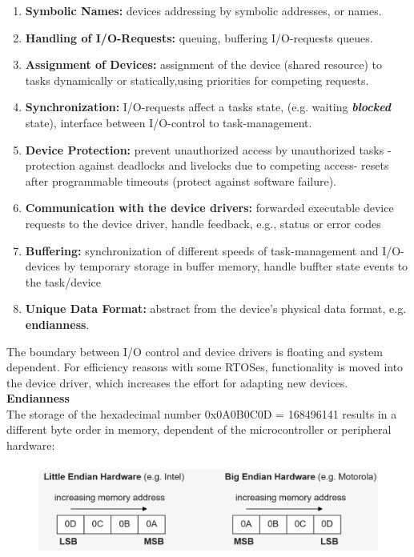 \begin{enumerate}
	\item  \textbf{Symbolic Names: }devices addressing by symbolic addresses, or names.
	\item  \textbf{Handling of I/O-Requests: }queuing, buffering I/O-requests  queues.
	\item  \textbf{Assignment of Devices: }assignment of the device (shared resource) to tasks dynamically or 	statically,using priorities for competing requests. 

	\item  \textbf{Synchronization: }I/O-requests affect a tasks state, (e.g. waiting  \textbf{\textit{blocked}} state), interface between I/O-control to task-management.

	\item  \textbf{Device Protection: } prevent unauthorized access by unauthorized tasks - protection against deadlocks and livelocks due to competing access- resets after programmable timeouts (protect against software failure).

	\item  \textbf{Communication with the device drivers: }forwarded executable device requests to the device driver, handle feedback, e.g., status or error codes 

	\item  \textbf{Buffering: }synchronization of different speeds of task-management and I/O-devices by temporary storage in buffer memory, handle buffter state events to the task/device

	\item  \textbf{Unique Data Format: }abstract from the device's physical data format, e.g. \textbf{endianness}.
\end{enumerate}

The boundary between I/O control and device drivers is floating and system dependent. For efficiency reasons with some RTOSes, functionality is moved into the device driver, which increases the effort for adapting new devices.\\

{\rot\bf Endianness}\\

The storage of the hexadecimal number 0x0A0B0C0D = 168496141 results in a different byte order in memory, dependent of the microcontroller or peripheral hardware:

 	\begin{figure}[h]
    \centering
    \includegraphics[width=14cm, height=3cm]{Images/image120.png}
    \label{fig:Fig }
    \end{figure}

